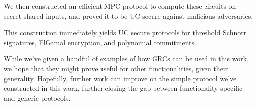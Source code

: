 We then constructed an efficient MPC protocol to compute these circuits
on secret shared inputs, and proved it to be UC secure against
malicious adversaries.

This construction immediately yields UC secure protocols for threshold Schnorr
signatures, ElGamal encryption, and polynomial commitments.

While we've given a handful of examples of how GRCs can be used
in this work, we hope that they might prove useful for other functionalities,
given their generality.
Hopefully, further work can improve on the simple protocol we've
constructed in this work, further closing the gap between
functionality-specific and generic protocols.


\small 

